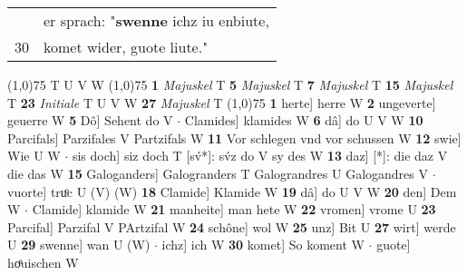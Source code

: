 \documentclass[8pt,a4paper,notitlepage]{article}
\begin{document}
\begin{table}[ht]
\begin{minipage}[t]{0.5\linewidth}
\begin{tabular}{rl}
 & er sprach: "\textbf{swenne} ichz iu enbiute,\\ 
30 & komet wider, guote liute."\\ 
\end{tabular}
\scriptsize
\line(1,0){75} \newline
T U V W \newline
\line(1,0){75} \newline
\textbf{1} \textit{Majuskel} T  \textbf{5} \textit{Majuskel} T  \textbf{7} \textit{Majuskel} T  \textbf{15} \textit{Majuskel} T  \textbf{23} \textit{Initiale} T U V W  \textbf{27} \textit{Majuskel} T  \newline
\line(1,0){75} \newline
\textbf{1} herte] herre W \textbf{2} ungeverte] geuerre W \textbf{5} Dô] Sehent do V  $\cdot$ Clamides] klamides W \textbf{6} dâ] do U V W \textbf{10} Parcifals] Parzifales V Partzifals W \textbf{11} Vor schlegen vnd vor schussen W \textbf{12} swie] Wie U W  $\cdot$ sis doch] siz doch T [sv́*]: sv́z do V sy des W \textbf{13} daz] [*]: die daz V die das W \textbf{15} Galoganders] Galogranders T Galograndres U Galogandres V  $\cdot$ vuorte] truͦc U (V) (W) \textbf{18} Clamide] Klamide W \textbf{19} dâ] do U V W \textbf{20} den] Dem W  $\cdot$ Clamide] klamide W \textbf{21} manheite] man hete W \textbf{22} vromen] vrome U \textbf{23} Parcifal] Parzifal V PArtzifal W \textbf{24} schône] wol W \textbf{25} unz] Bit U \textbf{27} wirt] werde U \textbf{29} swenne] wan U (W)  $\cdot$ ichz] ich W \textbf{30} komet] So koment W  $\cdot$ guote] hoͤuischen W \newline
\end{minipage}
\end{table}
\end{document}

